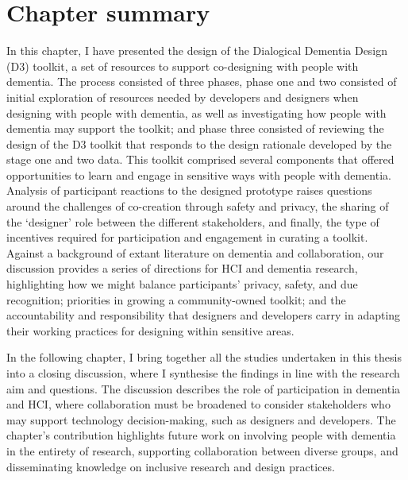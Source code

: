 \section{Chapter summary}
\label{D3:Summary}
In this chapter, I have presented the design of the Dialogical Dementia Design (D3) toolkit, a set of resources to support co-designing with people with dementia. The process consisted of three phases, phase one and two consisted of initial exploration of resources needed by developers and designers when designing with people with dementia, as well as investigating how people with dementia may support the toolkit; and phase three consisted of reviewing the design of the D3 toolkit that responds to the design rationale developed by the stage one and two data. This toolkit comprised several components that offered opportunities to learn and engage in sensitive ways with people with dementia. Analysis of participant reactions to the designed prototype raises questions around the challenges of co-creation through safety and privacy, the sharing of the ‘designer’ role between the different stakeholders, and finally, the type of incentives required for participation and engagement in curating a toolkit. Against a background of extant literature on dementia and collaboration, our discussion provides a series of directions for HCI and dementia research, highlighting how we might balance participants' privacy, safety, and due recognition; priorities in growing a community-owned toolkit; and the accountability and responsibility that designers and developers carry in adapting their working practices for designing within sensitive areas.

In the following chapter, I bring together all the studies undertaken in this thesis into a closing discussion, where I synthesise the findings in line with the research aim and questions. The discussion describes the role of participation in dementia and HCI, where collaboration must be broadened to consider stakeholders who may support technology decision-making, such as designers and developers. The chapter's contribution highlights future work on involving people with dementia in the entirety of research, supporting collaboration between diverse groups, and disseminating knowledge on inclusive research and design practices.